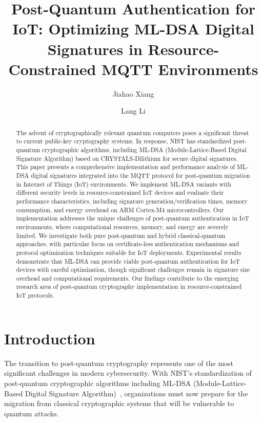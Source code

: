 \documentclass[journal=tches,final]{iacrtrans}
\author{Jiahao Xiang\inst{1} \and Lang Li\inst{1}}
\institute{
  Hengyang Normal University, College of Computer Science and Technology, Hengyang, China
}
\title[ML-DSA in IoT: MQTT Post-Quantum Authentication]{Post-Quantum Authentication for IoT: Optimizing ML-DSA Digital Signatures in Resource-Constrained MQTT Environments}
\begin{document}
\maketitle



\begin{abstract}
The advent of cryptographically relevant quantum computers poses a significant threat to current public-key cryptography systems. In response, NIST has standardized post-quantum cryptographic algorithms, including ML-DSA (Module-Lattice-Based Digital Signature Algorithm) based on CRYSTALS-Dilithium for secure digital signatures. This paper presents a comprehensive implementation and performance analysis of ML-DSA digital signatures integrated into the MQTT protocol for post-quantum migration in Internet of Things (IoT) environments.
We implement ML-DSA variants with different security levels in resource-constrained IoT devices and evaluate their performance characteristics, including signature generation/verification times, memory consumption, and energy overhead on ARM Cortex-M4 microcontrollers. Our implementation addresses the unique challenges of post-quantum authentication in IoT environments, where computational resources, memory, and energy are severely limited. We investigate both pure post-quantum and hybrid classical-quantum approaches, with particular focus on certificate-less authentication mechanisms and protocol optimization techniques suitable for IoT deployments.
Experimental results demonstrate that ML-DSA can provide viable post-quantum authentication for IoT devices with careful optimization, though significant challenges remain in signature size overhead and computational requirements. Our findings contribute to the emerging research area of post-quantum cryptography implementation in resource-constrained IoT protocols.

\end{abstract}


\section{Introduction}

The transition to post-quantum cryptography represents one of the most significant challenges in modern cybersecurity. With NIST's standardization of post-quantum cryptographic algorithms including ML-DSA (Module-Lattice-Based Digital Signature Algorithm)~\cite{NIST-PQC-Standards}, organizations must now prepare for the migration from classical cryptographic systems that will be vulnerable to quantum attacks.
\end{document}
